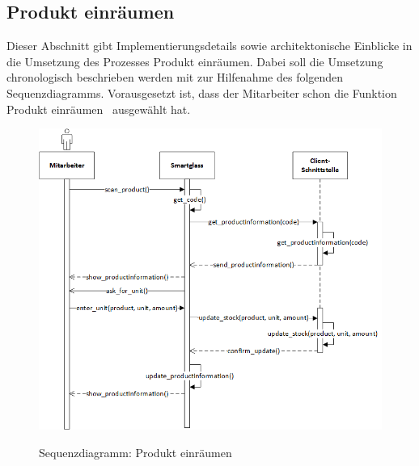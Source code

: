 \subsection{Produkt einräumen}
Dieser Abschnitt gibt Implementierungsdetails sowie architektonische Einblicke in die Umsetzung des Prozesses \glqq Produkt einräumen\grqq . Dabei soll die Umsetzung chronologisch beschrieben werden mit zur Hilfenahme des folgenden Sequenzdiagramms. Vorausgesetzt ist, dass der Mitarbeiter schon die Funktion \glqq Produkt einräumen\grqq~ ausgewählt hat. 

\begin{figure}[H]
	\centering
	{\includegraphics[scale=0.7]{Bilder/Abbildungen/SMAR_produkt_einraeumen_Sequenzdiagramm.png}}
	\caption{Sequenzdiagramm: Produkt einräumen}
	\label{fig:jwt_encode}
\end{figure}

